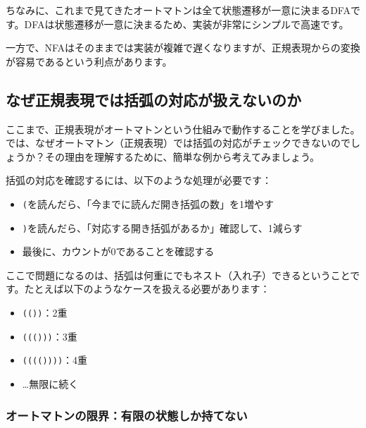 ちなみに、これまで見てきたオートマトンは全て状態遷移が一意に決まるDFAです。DFAは状態遷移が一意に決まるため、実装が非常にシンプルで高速です。

一方で、NFAはそのままでは実装が複雑で遅くなりますが、正規表現からの変換が容易であるという利点があります。

\hypertarget{chapter4-ux306aux305cux6b63ux898fux8868ux73feux3067ux306fux62ecux5f27ux306eux5bfeux5fdcux304cux6271ux3048ux306aux3044ux306eux304b}{%
\subsection{なぜ正規表現では括弧の対応が扱えないのか}\label{chapter4-ux306aux305cux6b63ux898fux8868ux73feux3067ux306fux62ecux5f27ux306eux5bfeux5fdcux304cux6271ux3048ux306aux3044ux306eux304b}}

ここまで、正規表現がオートマトンという仕組みで動作することを学びました。では、なぜオートマトン（正規表現）では括弧の対応がチェックできないのでしょうか？その理由を理解するために、簡単な例から考えてみましょう。

括弧の対応を確認するには、以下のような処理が必要です：

\begin{itemize}
\tightlist
\item
  \texttt{(}を読んだら、「今までに読んだ開き括弧の数」を1増やす
\item
  \texttt{)}を読んだら、「対応する開き括弧があるか」確認して、1減らす
\item
  最後に、カウントが0であることを確認する
\end{itemize}

ここで問題になるのは、括弧は何重にでもネスト（入れ子）できるということです。たとえば以下のようなケースを扱える必要があります：

\begin{itemize}
\tightlist
\item
  \texttt{(())}：2重
\item
  \texttt{((()))}：3重
\item
  \texttt{(((())))}：4重
\item
  \ldots 無限に続く
\end{itemize}

\hypertarget{chapter4-ux30aaux30fcux30c8ux30deux30c8ux30f3ux306eux9650ux754cux6709ux9650ux306eux72b6ux614bux3057ux304bux6301ux3066ux306aux3044}{%
\subsubsection{オートマトンの限界：有限の状態しか持てない}\label{chapter4-ux30aaux30fcux30c8ux30deux30c8ux30f3ux306eux9650ux754cux6709ux9650ux306eux72b6ux614bux3057ux304bux6301ux3066ux306aux3044}}

